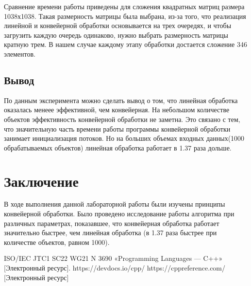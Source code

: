 \documentclass[12pt, a4paper]{report}
\begin{document}
	Сравнение времени работы приведены для сложения квадратных матриц размера 1038х1038. Такая размерность матрицы была выбрана, из-за того, что реализация линейной и конвейерной обработки основывается на трех очередях, и чтобы загрузить каждую очередь одинаково, нужно выбрать размерность матрицы кратную трем. В нашем случае каждому этапу обработки достается сложение 346 элементов.
	
	
	\section{Вывод}
	\hspace{0.5cm}По данным эксперимента можно сделать вывод о том, что линейная обработка оказалась менеее эффективной, чем конвейерная. На небольшом количестве объектов эффективность конвейерной обработки не заметна. Это связано с тем, что значительную часть времени работы программы конвейерной обработки занимает инициализация потоков. Но на больших объемах входных данных(1000 обрабатываемых объектов) линейная обработка работает в 1.37 раза дольше. 

	\chapter*{Заключение}
	\hspace{0.5cm}В ходе выполнения данной лабораторной работы были изучены принципы конвейерной обработки. Было проведено исследование работы алгоритма при различных параметрах, показавшее, что конвейерная обработка работает значительно быстрее, чем линейная обработка (в 1.37 раза быстрее
	при количестве объектов, равном 1000).
	
	\newpage
	
	\begin{thebibliography}{}
	 ISO/IEC JTC1 SC22 WG21 N 3690 «Programming Languages — C++»
	[Электронный ресурс]. https://devdocs.io/cpp/
	 https://cppreference.com/ [Электронный ресурс]
	\end{thebibliography}
\end{document}
